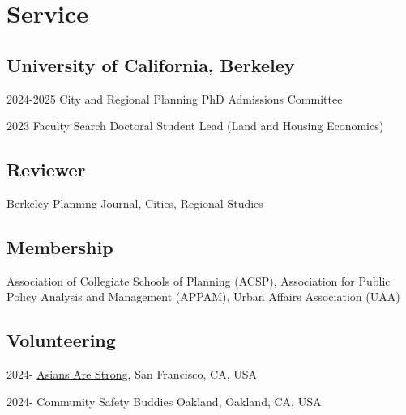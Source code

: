 \documentclass[12pt,letterpaper]{report}
\begin{document}
  \section*{Service}
  \subsection*{University of California, Berkeley}
    \begin{tablist}
        \item[2024-2025] \tab{}City and Regional Planning PhD Admissions Committee
        \item[2023] \tab{}Faculty Search Doctoral Student Lead (Land and Housing Economics)
    \end{tablist}
  \subsection*{Reviewer}
    Berkeley Planning Journal, Cities, Regional Studies
  \subsection*{Membership}
    Association of Collegiate Schools of Planning (ACSP), Association for Public Policy Analysis and Management (APPAM), Urban Affairs Association (UAA)
  \subsection*{Volunteering}
    \begin{tablist}
        \item[2024-] \tab{}\href{https://asiansarestrong.org/}{Asians Are Strong}, San Francisco, CA, USA
        \item[2024-] \tab{}Community Safety Buddies Oakland, Oakland, CA, USA
    \end{tablist}
\end{document}

